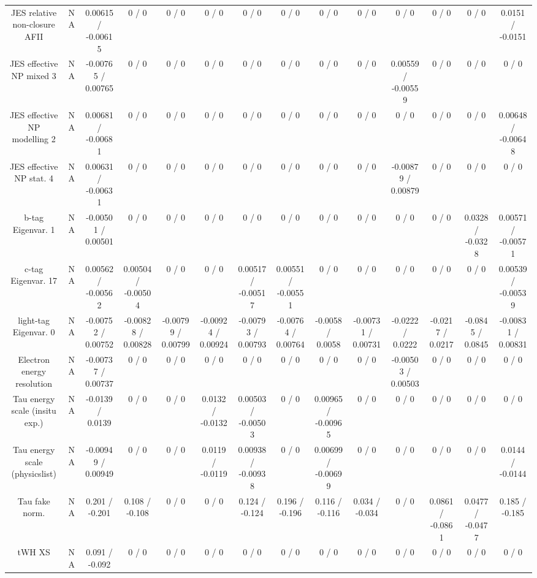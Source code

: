 \documentclass[10pt]{article}
\begin{document}
\begin{table}[htbp]
\begin{center}
\begin{tabular}{|c|c|c|c|c|c|c|c|c|c|c|c|c|c|}
  JES relative non-closure AFII &    NA    & 0.00615 / -0.00615 & 0 / 0 & 0 / 0 & 0 / 0 & 0 / 0 & 0 / 0 & 0 / 0 & 0 / 0 & 0 / 0 & 0 / 0 & 0 / 0 & 0.0151 / -0.0151 \\ 
  JES effective NP mixed 3 &    NA    & -0.00765 / 0.00765 & 0 / 0 & 0 / 0 & 0 / 0 & 0 / 0 & 0 / 0 & 0 / 0 & 0 / 0 & 0.00559 / -0.00559 & 0 / 0 & 0 / 0 & 0 / 0 \\ 
  JES effective NP modelling 2 &    NA    & 0.00681 / -0.00681 & 0 / 0 & 0 / 0 & 0 / 0 & 0 / 0 & 0 / 0 & 0 / 0 & 0 / 0 & 0 / 0 & 0 / 0 & 0 / 0 & 0.00648 / -0.00648 \\ 
  JES effective NP stat. 4 &    NA    & 0.00631 / -0.00631 & 0 / 0 & 0 / 0 & 0 / 0 & 0 / 0 & 0 / 0 & 0 / 0 & 0 / 0 & -0.00879 / 0.00879 & 0 / 0 & 0 / 0 & 0 / 0 \\ 
  b-tag Eigenvar. 1 &    NA    & -0.00501 / 0.00501 & 0 / 0 & 0 / 0 & 0 / 0 & 0 / 0 & 0 / 0 & 0 / 0 & 0 / 0 & 0 / 0 & 0 / 0 & 0.0328 / -0.0328 & 0.00571 / -0.00571 \\ 
  c-tag Eigenvar. 17 &    NA    & 0.00562 / -0.00562 & 0.00504 / -0.00504 & 0 / 0 & 0 / 0 & 0.00517 / -0.00517 & 0.00551 / -0.00551 & 0 / 0 & 0 / 0 & 0 / 0 & 0 / 0 & 0 / 0 & 0.00539 / -0.00539 \\ 
  light-tag Eigenvar. 0 &    NA    & -0.00752 / 0.00752 & -0.00828 / 0.00828 & -0.00799 / 0.00799 & -0.00924 / 0.00924 & -0.00793 / 0.00793 & -0.00764 / 0.00764 & -0.0058 / 0.0058 & -0.00731 / 0.00731 & -0.0222 / 0.0222 & -0.0217 / 0.0217 & -0.0845 / 0.0845 & -0.00831 / 0.00831 \\ 
  Electron energy resolution &    NA    & -0.00737 / 0.00737 & 0 / 0 & 0 / 0 & 0 / 0 & 0 / 0 & 0 / 0 & 0 / 0 & 0 / 0 & -0.00503 / 0.00503 & 0 / 0 & 0 / 0 & 0 / 0 \\ 
  Tau energy scale (insitu exp.) &    NA    & -0.0139 / 0.0139 & 0 / 0 & 0 / 0 & 0.0132 / -0.0132 & 0.00503 / -0.00503 & 0 / 0 & 0.00965 / -0.00965 & 0 / 0 & 0 / 0 & 0 / 0 & 0 / 0 & 0 / 0 \\ 
  Tau energy scale (physicslist) &    NA    & -0.00949 / 0.00949 & 0 / 0 & 0 / 0 & 0.0119 / -0.0119 & 0.00938 / -0.00938 & 0 / 0 & 0.00699 / -0.00699 & 0 / 0 & 0 / 0 & 0 / 0 & 0 / 0 & 0.0144 / -0.0144 \\ 
  Tau fake norm. &    NA    & 0.201 / -0.201 & 0.108 / -0.108 & 0 / 0 & 0 / 0 & 0.124 / -0.124 & 0.196 / -0.196 & 0.116 / -0.116 & 0.034 / -0.034 & 0 / 0 & 0.0861 / -0.0861 & 0.0477 / -0.0477 & 0.185 / -0.185 \\ 
  tWH XS &    NA    & 0.091 / -0.092 & 0 / 0 & 0 / 0 & 0 / 0 & 0 / 0 & 0 / 0 & 0 / 0 & 0 / 0 & 0 / 0 & 0 / 0 & 0 / 0 & 0 / 0 \\ 

\end{tabular}
\end{center}
\end{table}
\end{document}
